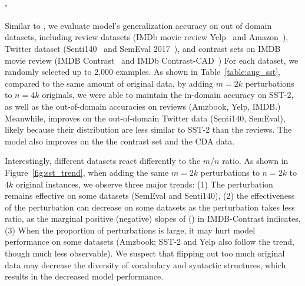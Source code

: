 \paragraph{\sst.}
 Similar to \citet{kaushik2019learning}, we evaluate \sst model's generalization accuracy on out of domain datasets, including review datasets (IMDb movie review Yelp~\cite{} and Amazon~\cite{}), Twitter dataset (Senti140~\cite{} and SemEval 2017~\cite{}), and contrast sets on IMDB movie review (IMDB Contrast~\cite{} and IMDb Contrast-CAD~\cite{})  
For each dataset, we randomly selected up to 2,000 examples.
As shown in Table~\ref{table:aug_sst}, compared to the same amount of original data, by adding $m=2k$ perturbations to $n=4k$ originals, we were able to maintain the  in-domain accuracy on SST-2, as well as the out-of-domain accuracies on reviews (Amzbook, Yelp, IMDB.)
Meanwhile, \maug improves on the out-of-domain Twitter data (Senti140, SemEval), likely because their distribution are less similar to SST-2 than the reviews.
The model also improves on the the contrast set and the CDA data.

Interestingly, different datasets react differently to the $m/n$ ratio.
As shown in Figure~\ref{fig:sst_trend}, when adding the same $m=2k$ perturbations to $n=2k$ to $4k$ original instances, we observe three major trends:
(1) The perturbation remains effective on some datasets (SemEval and Senti140), 
(2) the effectiveness of the perturbation can decrease on some datasets as the perturbation takes less ratio, as the marginal positive (negative) slopes of \mcomp (\maug) in IMDB-Contrast indicates,
(3) When the proportion of perturbations is large, it may hurt model performance on some datasets (Amzbook; SST-2 and Yelp also follow the trend, though much less observable).
We suspect that flipping out too much original data may decrease the diversity of vocabulary and syntactic structures, which results in the decreased model performance.




